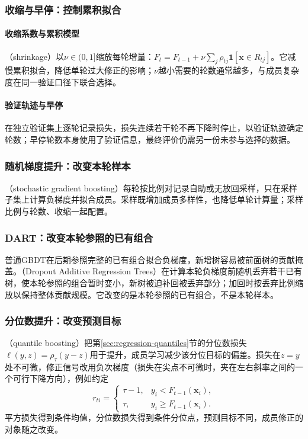 \subsubsection{收缩与早停：控制累积拟合}
\label{sec:ensemble-shrinkage}

\paragraph{收缩系数与累积模型}
（shrinkage）以$\nu\in(0,1]$缩放每轮增量：$F_t=F_{t-1}+\nu\sum_j\rho_{tj}\mathbf1[\bm x\in R_{tj}]$。它减慢累积拟合，降低单轮过大修正的影响；$\nu$越小需要的轮数通常越多，与成员复杂度在同一验证口径下联合选择。

\paragraph{验证轨迹与早停}
在独立验证集上逐轮记录损失，损失连续若干轮不再下降时停止，以验证轨迹确定轮数；早停轮数本身使用了验证信息，最终评价仍需另一份未参与选择的数据。

\subsubsection{随机梯度提升：改变本轮样本}
\label{sec:ensemble-stochastic-gb}
（stochastic gradient boosting）每轮按比例对记录自助或无放回采样，只在采样子集上计算负梯度并拟合成员。采样既增加成员多样性，也降低单轮计算量；采样比例与轮数、收缩一起配置。

\subsubsection{DART：改变本轮参照的已有组合}
\label{sec:ensemble-dart}
普通GBDT在后期参照完整的已有组合拟合负梯度，新增树容易被前面树的贡献掩盖。（Dropout Additive Regression Trees）在计算本轮负梯度前随机丢弃若干已有树，使本轮参照的组合暂时变小，新树被迫补回被丢弃部分；加回时按丢弃比例缩放以保持整体贡献规模。它改变的是本轮参照的已有组合，不是本轮样本。

\subsubsection{分位数提升：改变预测目标}
（quantile boosting）把第\ref{sec:regression-quantiles}节的分位数损失$\ell(y,z)=\rho_\tau(y-z)$用于提升，成员学习减少该分位目标的偏差。损失在$z=y$处不可微，修正信号改用负次梯度（损失在尖点不可微时，夹在左右斜率之间的一个可行下降方向），例如约定
\[
  r_{ti}=\begin{cases}\tau-1,&y_i<F_{t-1}(\bm x_i),\\ \tau,&y_i\ge F_{t-1}(\bm x_i).\end{cases}
\]
平方损失得到条件均值，分位数损失得到条件分位点，预测目标不同，成员修正的对象随之改变。

